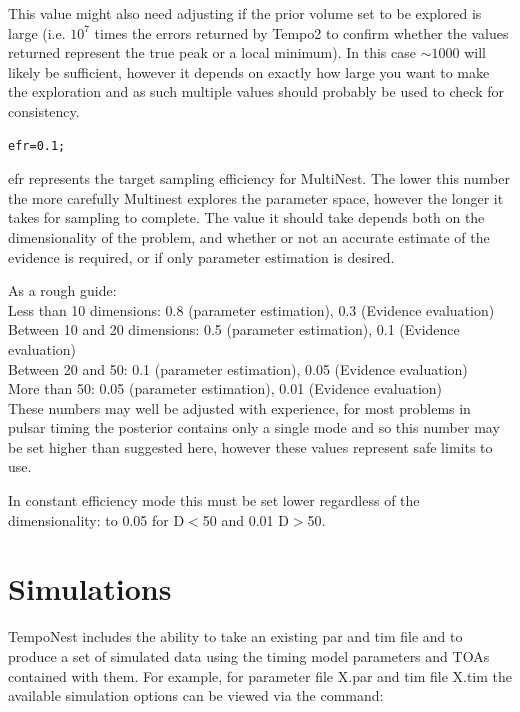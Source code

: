 \documentclass[%
 preprint,
 amsmath,amssymb,amsfonts,
 aps,
]{revtex4-1}
\begin{document}
This value might also need adjusting if the prior volume set to be explored is large (i.e. $10^7$ times the errors returned by Tempo2 to confirm whether the values returned represent the true peak or a local minimum).  In this case $\sim 1000$ will likely be sufficient, however it depends on exactly how large you want to make the exploration and as such multiple values should probably be used to check for consistency.

\begin{lstlisting}
efr=0.1;
\end{lstlisting}  

efr represents the target sampling efficiency for MultiNest.  The lower this number the more carefully Multinest explores the parameter space, however the longer it takes for sampling to complete.
The value it should take depends both on the dimensionality of the problem, and whether or not an accurate estimate of the evidence is required, or if only parameter estimation is desired.

As a rough guide:\\
%
Less than 10 dimensions: 0.8 (parameter estimation), 0.3 (Evidence evaluation) \\
Between 10 and 20 dimensions: 0.5 (parameter estimation), 0.1 (Evidence evaluation)\\
Between 20 and 50: 0.1 (parameter estimation), 0.05 (Evidence evaluation)\\
More than 50: 0.05 (parameter estimation), 0.01 (Evidence evaluation)\\

These numbers may well be adjusted with experience, for most problems in pulsar timing the posterior contains only a single mode and so this number may be set higher than suggested here, however these values represent safe limits to use.

In constant efficiency mode this must be set lower regardless of the dimensionality: to 0.05 for D$<$50 and 0.01 D$>$50.

\section{Simulations}
\label{Section:Sim}

TempoNest includes the ability to take an existing par and tim file and to produce a set of simulated data using the timing model parameters and TOAs contained with them.  For example, for parameter file X.par and tim file X.tim the available simulation options can be viewed via the command:
\end{document}
